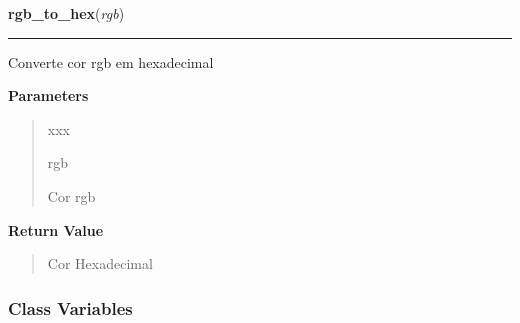     \label{color:Color:rgb_to_hex}

    \vspace{0.5ex}

\hspace{.8\funcindent}\begin{boxedminipage}{\funcwidth}

    \raggedright \textbf{rgb\_to\_hex}(\textit{rgb})

    \vspace{-1.5ex}

    \rule{\textwidth}{0.5\fboxrule}
\setlength{\parskip}{2ex}
    Converte cor rgb em hexadecimal

\setlength{\parskip}{1ex}
      \textbf{Parameters}
      \vspace{-1ex}

      \begin{quote}
        \begin{Ventry}{xxx}

          \item[rgb]

          Cor rgb

        \end{Ventry}

      \end{quote}

      \textbf{Return Value}
    \vspace{-1ex}

      \begin{quote}
      Cor Hexadecimal

      \end{quote}

    \end{boxedminipage}



  \subsubsection{Class Variables}


